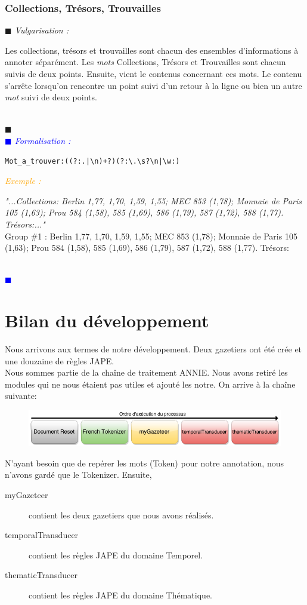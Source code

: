 \documentclass[a4paper, 11pt]{report}
\newenvironment{vulgarisation}
    {
    \textit{\textcolor{dark-blue}{$\blacksquare$  Vulgarisation : \\}}

    }
    {
    ~\\\textcolor{dark-blue}{$\blacksquare$}\\
    }
\newenvironment{formalisation}
    {
    \textit{\textcolor{blue}{$\blacksquare$  Formalisation : \\}}
    }
    {
    ~\\\textcolor{blue}{$\blacksquare$}\\
    }
\newenvironment{exemple}
    {
    \textit{\textcolor{orange}{
    Exemple : \\}}
    }
    {~\\
    }
\begin{document}
\subsubsection{Collections, Trésors, Trouvailles}
\begin{vulgarisation}
Les collections, trésors et trouvailles sont chacun des ensembles d'informations à annoter séparément.
	Les \textit{mots} Collections, Trésors et Trouvailles sont chacun suivis de deux points. Ensuite, vient le contenus concernant ces mots. Le contenu s'arrête lorsqu'on rencontre un point suivi d'un retour à la ligne ou bien un autre \textit{mot} suivi de deux points.
\end{vulgarisation}
\begin{formalisation}
	\begin{verbatim}
Mot_a_trouver:((?:.|\n)+?)(?:\.\s?\n|\w:)
	\end{verbatim}
	\begin{exemple}
		\emph{"...Collections: Berlin 1,77, 1,70, 1,59,
			1,55; MEC 853 (1,78); Monnaie de Paris 105 (1,63); Prou 584 (1,58), 585 (1,69), 586 (1,79), 587 
			(1,72), 588 (1,77). Trésors:..."}\\
		Group \#1 :  Berlin 1,77, 1,70, 1,59,
		1,55; MEC 853 (1,78); Monnaie de Paris 105 (1,63); Prou 584 (1,58), 585 (1,69), 586 (1,79), 587 (1,72), 588 (1,77). Trésors:
	\end{exemple}
\end{formalisation}

\section{Bilan du développement}
Nous arrivons aux termes de notre développement. Deux gazetiers ont été crée et une douzaine de règles JAPE.\\
Nous sommes partie de la chaîne de traitement ANNIE. Nous avons retiré les modules qui ne nous étaient pas utiles et ajouté les notre. On arrive à la chaîne suivante:
\begin{figure}[H]
\centering
\includegraphics[scale=.5]{img/notreChaine.png}
\end{figure}
N'ayant besoin que de repérer les mots (Token) pour notre annotation, nous n'avons gardé que le Tokenizer. Ensuite, 
\begin{description}
\item[myGazeteer] contient les deux gazetiers que nous avons réalisés.
\item[temporalTransducer] contient les règles JAPE du domaine Temporel.
\item[thematicTransducer] contient les règles JAPE du domaine Thématique.
\end{description}
\end{document}
